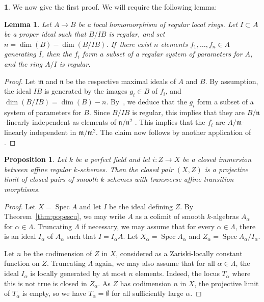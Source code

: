 \documentclass[11pt]{article}
\numberwithin{equation}{section}\renewcommand{\encodingdefault}{TU}
\DeclareMathOperator{\spec}{Spec}
\newtheorem{prop}[thm]{Proposition}
\newtheorem{lm}[thm]{Lemma}
\theoremstyle{remark}
\theoremstyle{definition}
\newtheorem{num}[thm]{}
\numberwithin{equation}{thm}
\begin{document}
\begin{num}
We now give the first proof.
We will require the following lemma:

\begin{lm}
\label{lm:local_gen}
Let $A \to B$ be a local homomorphism of regular local rings.
Let $I\subset A$ be a proper ideal such that $B/IB$ is regular, and set $n = \dim(B) - \dim(B/IB)$.
If~there exist $n$ elements $f_1,\ldots,f_n \in A$ generating $I$, then the $f_i$ form a subset of a regular system of parameters for $A$, and the ring $A/I$ is regular.
\end{lm}

\begin{proof}
Let $\mathfrak{m}$ and $\mathfrak{n}$ be the respective maximal ideals of $A$ and $B$.
By assumption, the ideal $IB$ is generated by the images $g_i \in B$ of $f_i$, and \hbox{$\dim(B/IB) = \dim(B) - n$}.
By~\cite[0, Prop.\,16.3.7]{EGA4}, we deduce that the $g_i$ form a subset of a system of parameters for $B$.
Since $B/IB$ is regular, this implies that they are $B/\mathfrak{n}$-linearly independent as elements of $\mathfrak{n}/\mathfrak{n}^2$ \cite[0, Prop.\,17.1.7]{EGA4}.
This implies that the $f_i$ are $A/\mathfrak{m}$-linearly independent in $\mathfrak{m}/\mathfrak{m}^2$.
The claim now follows by another application of \cite[0, Prop.\,17.1.7]{EGA4}.
\end{proof}

\begin{prop}
\label{prop:aff_reg_pur}
Let $k$ be a perfect field and let $i:Z\to X$ be a closed immersion between affine regular $k$-schemes. Then the closed pair $(X,Z)$ is a projective limit of closed pairs of smooth $k$-schemes with transverse affine transition morphisms.
\end{prop}
\begin{proof}
Let $X=\spec A$ and let $I$ be the ideal defining $Z$. By Theorem~\ref{thm:popescu}, we may write $A$ as a colimit of smooth $k$-algebras $A_\alpha$ for $\alpha\in \Lambda$.
Truncating $\Lambda$ if necessary, we may assume that for every $\alpha\in\Lambda$, there is an ideal $I_\alpha$ of $A_\alpha$ such that $I=I_\alpha A$.
Let $X_\alpha=\spec A_\alpha$ and $Z_\alpha=\spec A_\alpha/I_\alpha$.

Let $n$ be the codimension of $Z$ in $X$, considered as a Zariski-locally constant function on $Z$.
Truncating $\Lambda$ again, we may also assume that for all $\alpha\in\Lambda$, the ideal $I_\alpha$ is locally generated by at most $n$ elements. Indeed, the locus $T_\alpha$ where this is not true is closed in $Z_\alpha$. As $Z$ has codimension $n$ in $X$, the projective limit of $T_\alpha$ is empty, so we have $T_\alpha=\emptyset$ for all sufficiently large $\alpha$.


\end{proof}
\end{num}
\end{document}
